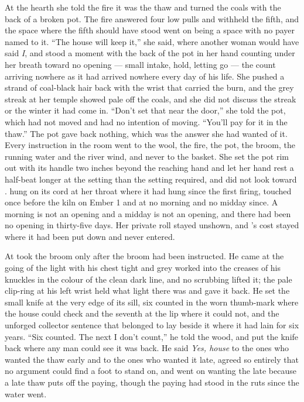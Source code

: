 At the hearth she told the fire it was the thaw and turned the coals with the back of a broken pot. The fire answered four low pulls and withheld the fifth, and the space where the fifth should have stood went on being a space with no payer named to it. “The house will keep it,” she said, where another woman would have said \emph{I}, and stood a moment with the back of the pot in her hand counting under her breath toward no opening --- small intake, hold, letting go --- the count arriving nowhere as it had arrived nowhere every day of his life. She pushed a strand of coal-black hair back with the wrist that carried the burn, and the grey streak at her temple showed pale off the coals, and she did not discuss the streak or the winter it had come in. “Don't set that near the door,” she told the pot, which had not moved and had no intention of moving. “You'll pay for it in the thaw.” The pot gave back nothing, which was the answer she had wanted of it. Every instruction in the room went to the wool, the fire, the pot, the broom, the running water and the river wind, and never to the basket. She set the pot rim out with its handle two inches beyond the reaching hand and let her hand rest a half-beat longer at the setting than the setting required, and did not look toward .  hung on its cord at her throat where it had hung since the first firing, touched once before the kiln on Ember 1 and at no morning and no midday since. A morning is not an opening and a midday is not an opening, and there had been no opening in thirty-five days. Her private roll stayed unshown, and 's cost stayed where it had been put down and never entered.

\scenebreak

At   took the broom only after the broom had been instructed. He came at the going of the light with his chest tight and grey  worked into the creases of his knuckles in the colour of the clean dark line, and no scrubbing lifted it; the pale clip-ring at his left wrist held what light there was and gave it back. He set the small knife at the very edge of its sill, six counted in the worn thumb-mark where the house could check and the seventh at the lip where it could not, and the unforged collector sentence that belonged to  lay beside it where it had lain for six years. “Six counted. The next I don't count,” he told the wood, and put the knife back where any man could see it was back. He said \emph{Yes, house} to the ones who wanted the thaw early and to the ones who wanted it late, agreed so entirely that no argument could find a foot to stand on, and went on wanting the late because a late thaw puts off the paying, though the paying had stood in the ruts since the water went.

